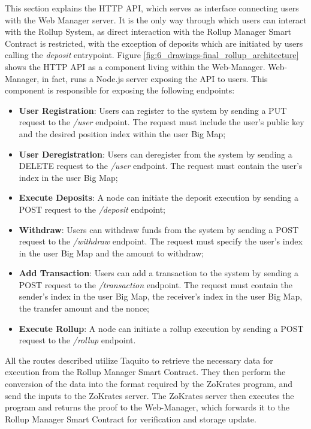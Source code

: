 This section explains the HTTP API, which serves as interface connecting users with the Web Manager server. It is the only way through which users can interact with the Rollup System, as direct interaction with the Rollup Manager Smart Contract is restricted, with the exception of deposits which are initiated by users calling the \textit{deposit} entrypoint. Figure \ref{fig:6_drawings-final_rollup_architecture} shows the HTTP API as a component living within the Web-Manager. Web-Manager, in fact, runs a Node.js server exposing the API to users. This component is responsible for exposing the following endpoints:
\vspace{-0.11in}
\begin{itemize}
	\item \textbf{User Registration}: Users can register to the system by sending a PUT request to the \textit{/user} endpoint. The request must include the user's public key and the desired position index within the user Big Map;
	      \vspace{-0.11in}
	\item \textbf{User Deregistration}: Users can deregister from the system by sending a DELETE request to the \textit{/user} endpoint. The request must contain the user's index in the user Big Map;
	      \vspace{-0.11in}
	\item \textbf{Execute Deposits}: A node can initiate the deposit execution by sending a POST request to the \textit{/deposit} endpoint;
	      \vspace{-0.11in}
	\item \textbf{Withdraw}: Users can withdraw funds from the system by sending a POST request to the \textit{/withdraw} endpoint. The request must specify the user's index in the user Big Map and the amount to withdraw;
	      \vspace{-0.11in}
	\item \textbf{Add Transaction}: Users can add a transaction to the system by sending a POST request to the \textit{/transaction} endpoint. The request must contain the sender's index in the user Big Map, the receiver's index in the user Big Map, the transfer amount and the nonce;
	      \vspace{-0.11in}
	\item \textbf{Execute Rollup}: A node can initiate a rollup execution by sending a POST request to the \textit{/rollup} endpoint.
\end{itemize}

\noindent All the routes described utilize Taquito to retrieve the necessary data for execution from the Rollup Manager Smart Contract. They then perform the conversion of the data into the format required by the ZoKrates program, and send the inputs to the ZoKrates server. The ZoKrates server then executes the program and returns the proof to the Web-Manager, which forwards it to the Rollup Manager Smart Contract for verification and storage update.

